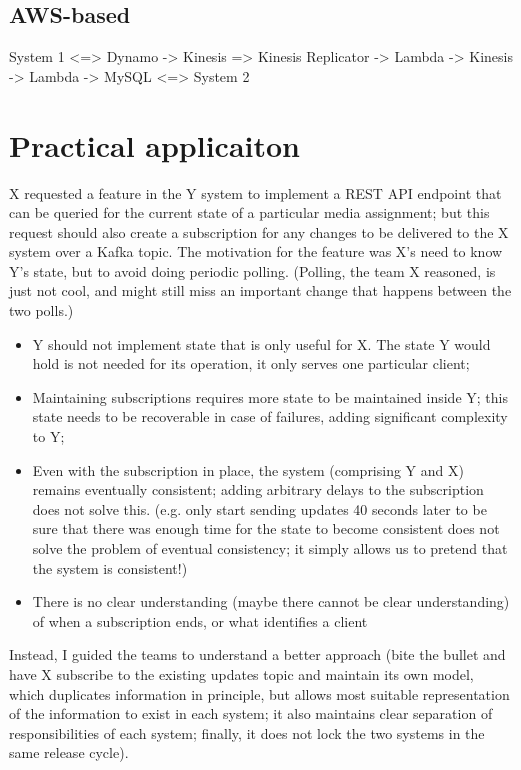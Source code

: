 \subsection{AWS-based}

System 1 <=> Dynamo 
          -> Kinesis => Kinesis Replicator -> Lambda -> Kinesis -> Lambda -> MySQL <=> System 2

\section{Practical applicaiton}
X requested a feature in the Y system to implement a REST API endpoint that can be queried for the current state of a particular media assignment; but this request should also create a subscription for any changes to be delivered to the X system over a Kafka topic. The motivation for the feature was X’s need to know Y’s state, but to avoid doing periodic polling. (Polling, the team X reasoned, is just not cool, and might still miss an important change that happens between the two polls.)
\begin{itemize}
  \item Y should not implement state that is only useful for X. The state Y would hold is not needed for its operation, it only serves one particular client;
  \item Maintaining subscriptions requires more state to be maintained inside Y; this state needs to be recoverable in case of failures, adding significant complexity to Y;
  \item  Even with the subscription in place, the system (comprising Y and X) remains eventually consistent; adding arbitrary delays to the subscription does not solve this. (e.g. only start sending updates 40 seconds later to be sure that there was enough time for the state to become consistent does not solve the problem of eventual consistency; it simply allows us to pretend that the system is consistent!)
  \item There is no clear understanding (maybe there cannot be clear understanding) of when a subscription ends, or what identifies a client
\end{itemize}
Instead, I guided the teams to understand a better approach (bite the bullet and have X subscribe to the existing updates topic and maintain its own model, which duplicates information in principle, but allows most suitable representation of the information to exist in each system; it also maintains clear separation of responsibilities of each system; finally, it does not lock the two systems in the same release cycle).


\printbibliography

